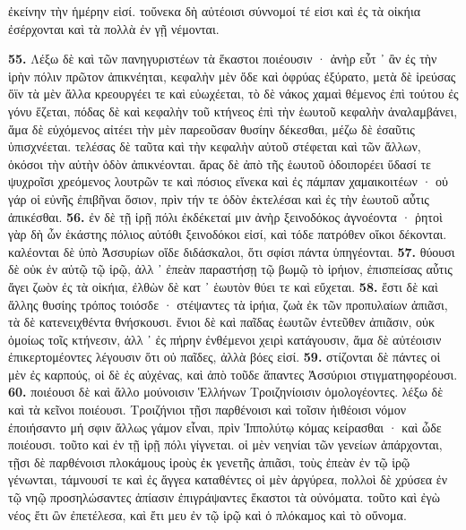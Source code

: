\documentclass[a4paper, 11pt, oneside, polutonikogreek, german]{article}
\begin{document}
ἐκείνην τὴν ἡμέρην εἰσί. τοὔνεκα δὴ αὐτέοισι σύννομοί τέ εἰσι καὶ ἐς τὰ οἰκήια ἐσέρχονται καὶ τὰ πολλὰ ἐν γῇ νέμονται.

\textbf{55.} Λέξω δὲ καὶ τῶν πανηγυριστέων τὰ ἕκαστοι ποιέουσιν · ἀνὴρ εὖτ ᾽ ἂν ἐς τὴν ἱρὴν πόλιν πρῶτον ἀπικνέηται, κεφαλὴν μὲν ὅδε καὶ ὀφρύας ἐξύρατο, μετὰ δὲ ἱρεύσας ὄϊν τὰ μὲν ἄλλα κρεουργέει τε καὶ εὐωχέεται, τὸ δὲ νάκος χαμαὶ θέμενος ἐπὶ τούτου ἐς γόνυ ἕζεται, πόδας δὲ καὶ κεφαλὴν τοῦ κτήνεος ἐπὶ τὴν ἑωυτοῦ κεφαλὴν ἀναλαμβάνει, ἅμα δὲ εὐχόμενος αἰτέει τὴν μὲν παρεοῦσαν θυσίην δέκεσθαι, μέζω δὲ ἐσαῦτις ὑπισχνέεται. τελέσας δὲ ταῦτα καὶ τὴν κεφαλὴν αὐτοῦ στέφεται καὶ τῶν ἄλλων, ὁκόσοι τὴν αὐτὴν ὁδὸν ἀπικνέονται. ἄρας δὲ ἀπὸ τῆς ἑωυτοῦ ὁδοιπορέει ὕδασί τε ψυχροῖσι χρεόμενος λουτρῶν τε καὶ πόσιος εἵνεκα καὶ ἐς πάμπαν χαμαικοιτέων · οὐ γάρ οἱ εὐνῆς ἐπιβῆναι ὅσιον, πρὶν τήν τε ὁδὸν ἐκτελέσαι καὶ ἐς τὴν ἑωυτοῦ αὖτις ἀπικέσθαι. \textbf{56.} ἐν δὲ τῇ ἱρῇ πόλι ἐκδέκεταί μιν ἀνὴρ ξεινοδόκος ἀγνοέοντα · ῥητοὶ γὰρ δὴ ὦν ἑκάστης πόλιος αὐτόθι ξεινοδόκοι εἰσί, καὶ τόδε πατρόθεν οἴκοι δέκονται. καλέονται δὲ ὑπὸ Ἀσσυρίων οἵδε διδάσκαλοι, ὅτι σφίσι πάντα ὑπηγέονται. \textbf{57.} θύουσι δὲ οὐκ ἐν αὐτῷ τῷ ἱρῷ, ἀλλ ᾽ ἐπεὰν παραστήσῃ τῷ βωμῷ τὸ ἱρήιον, ἐπισπείσας αὖτις ἄγει ζωὸν ἐς τὰ οἰκήια, ἐλθὼν δὲ κατ ᾽ ἑωυτὸν θύει τε καὶ εὔχεται. \textbf{58.} ἔστι δὲ καὶ ἄλλης θυσίης τρόπος τοιόσδε · στέψαντες τὰ ἱρήια, ζωὰ ἐκ τῶν προπυλαίων ἀπιᾶσι, τὰ δὲ κατενειχθέντα θνήσκουσι. ἔνιοι δὲ καὶ παῖδας ἑωυτῶν ἐντεῦθεν ἀπιᾶσιν, οὐκ ὁμοίως τοῖς κτήνεσιν, ἀλλ ᾽ ἐς πήρην ἐνθέμενοι χειρὶ κατάγουσιν, ἅμα δὲ αὐτέοισιν ἐπικερτομέοντες λέγουσιν ὅτι οὐ παῖδες, ἀλλὰ βόες εἰσί. \textbf{59.} στίζονται δὲ πάντες οἱ μὲν ἐς καρπούς, οἱ δὲ ἐς αὐχένας, καὶ ἀπὸ τοῦδε ἅπαντες Ἀσσύριοι στιγματηφορέουσι. \textbf{60.} ποιέουσι δὲ καὶ ἄλλο μούνοισιν Ἑλλήνων Τροιζηνίοισιν ὁμολογέοντες. λέξω δὲ καὶ τὰ κεῖνοι ποιέουσι. Τροιζήνιοι τῇσι παρθένοισι καὶ τοῖσιν ἠιθέοισι νόμον ἐποιήσαντο μή σφιν ἄλλως γάμον εἶναι, πρὶν Ἱππολύτῳ κόμας κείρασθαι · καὶ ὧδε ποιέουσι. τοῦτο καὶ ἐν τῇ ἱρῇ πόλι γίγνεται. οἱ μὲν νεηνίαι τῶν γενείων ἀπάρχονται, τῇσι δὲ παρθένοισι πλοκάμους ἱροὺς ἐκ γενετῆς ἀπιᾶσι, τοὺς ἐπεὰν ἐν τῷ ἱρῷ γένωνται, τάμνουσί τε καὶ ἐς ἄγγεα καταθέντες οἱ μὲν ἀργύρεα, πολλοὶ δὲ χρύσεα ἐν τῷ νηῷ προσηλώσαντες ἀπίασιν ἐπιγράψαντες ἕκαστοι τὰ οὐνόματα. τοῦτο καὶ ἐγὼ νέος ἔτι ὢν ἐπετέλεσα, καὶ ἔτι μευ ἐν τῷ ἱρῷ καὶ ὁ πλόκαμος καὶ τὸ οὔνομα.
\clearpage
\end{document}
